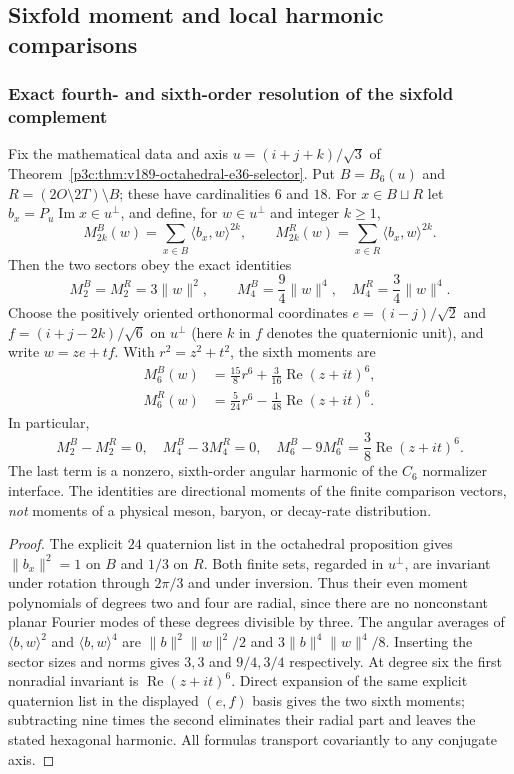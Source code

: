 \documentclass[12pt,a4paper]{article}
\begin{document}
\subsection{Sixfold moment and local harmonic comparisons}


\subsubsection{Exact fourth- and sixth-order resolution of the sixfold complement}
\label{p3c:subsec:v190-sixfold-higher-moment-bridge}

\begin{proposition}
\label{p3c:prop:v190-sixfold-moment-hierarchy}
Fix the mathematical data and axis $u=(i+j+k)/\sqrt3$ of
Theorem~\ref{p3c:thm:v189-octahedral-e36-selector}. Put
$B=B_6(u)$ and $R=(2O\setminus 2T)\setminus B$; these have cardinalities
$6$ and $18$. For $x\in B\sqcup R$ let
$b_x=P_u\operatorname{Im}x\in u^\perp$, and define, for
$w\in u^\perp$ and integer $k\ge1$,
\[
 M_{2k}^{B}(w)=\sum_{x\in B}\langle b_x,w\rangle^{2k},
 \qquad
 M_{2k}^{R}(w)=\sum_{x\in R}\langle b_x,w\rangle^{2k}.
\]
Then the two sectors obey the exact identities
\[
\boxed{
 M_2^B=M_2^R=3\|w\|^2,
 \qquad
 M_4^B=\frac94\|w\|^4,
 \quad
 M_4^R=\frac34\|w\|^4.}
\]
Choose the positively oriented orthonormal coordinates
$e=(i-j)/\sqrt2$ and $f=(i+j-2k)/\sqrt6$ on $u^\perp$
(here $k$ in $f$ denotes the quaternionic unit), and write
$w=ze+tf$.  With $r^2=z^2+t^2$, the sixth moments are
\[
\boxed{\begin{aligned}
 M_6^B(w)&=\frac{15}{8}r^6+
      \frac{3}{16}\operatorname{Re}(z+it)^6,\\
 M_6^R(w)&=\frac5{24}r^6-
      \frac1{48}\operatorname{Re}(z+it)^6.
\end{aligned}}
\]
In particular,
\[
\boxed{
 M_2^B-M_2^R=0,\quad
 M_4^B-3M_4^R=0,\quad
 M_6^B-9M_6^R=\frac38\operatorname{Re}(z+it)^6.}
\]
The last term is a nonzero, sixth-order angular harmonic of the
$C_6$ normalizer interface. The identities are directional moments
of the finite comparison vectors, \emph{not} moments of a physical
meson, baryon, or decay-rate distribution.
\end{proposition}
\begin{proof}
The explicit $24$ quaternion list in the octahedral
proposition gives $\|b_x\|^2=1$ on $B$ and $1/3$ on $R$.
Both finite sets, regarded in $u^\perp$, are invariant under rotation
through $2\pi/3$ and under inversion. Thus their even moment
polynomials of degrees two and four are radial, since there are no
nonconstant planar Fourier modes of these degrees divisible by three.
The angular averages of $\langle b,w\rangle^2$ and
$\langle b,w\rangle^4$ are $\|b\|^2\|w\|^2/2$ and
$3\|b\|^4\|w\|^4/8$. Inserting the sector sizes and norms gives
$3,3$ and $9/4,3/4$ respectively.
At degree six the first nonradial invariant is
$\operatorname{Re}(z+it)^6$. Direct expansion of the same explicit
quaternion list in the displayed $(e,f)$ basis gives the two sixth
moments; subtracting nine times the second eliminates their radial
part and leaves the stated hexagonal harmonic. All formulas transport
covariantly to any conjugate axis.
\end{proof}
\end{document}
